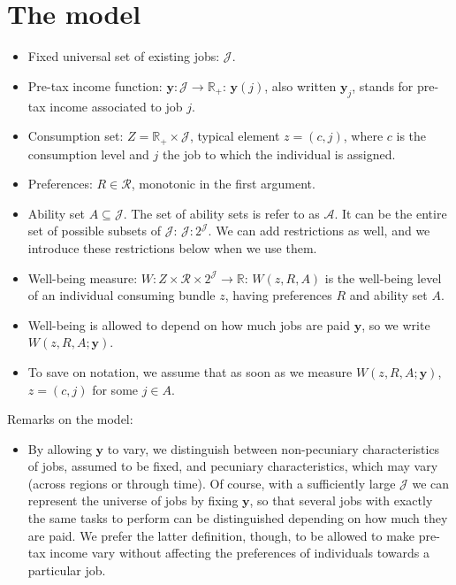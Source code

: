 \section{The model}

\begin{itemize}
    \item Fixed universal set of existing jobs: $\mathcal{J}$.
    \item Pre-tax income function: $\mathbf{y}:\mathcal{J}\rightarrow \mathbb{R}_{+}$: $\mathbf{y}(j)$, also written $\mathbf{y}_j$, stands for pre-tax income associated to job $j$. 
    \item Consumption set: $Z=\mathbb{R}_{+}\times \mathcal{J}$, typical element $z=(c,j)$, where $c$ is the consumption level and $j$ the job to which the individual is assigned.
    \item Preferences: $R\in\mathcal{R}$, monotonic in the first argument.
    \item Ability set $A\subseteq \mathcal{J}$. The set of ability sets is refer to as $\mathcal{A}$. It can be the entire set of possible subsets of $\mathcal{J}$: $\mathcal{J}:2^{\mathcal{J}}$. We can add restrictions as well, and we introduce these restrictions below when we use them.
    \item Well-being measure: $W: Z\times \mathcal{R} \times 2^{\mathcal{J}}\rightarrow \mathbb{R}$: $W(z,R,A)$ is the well-being level of an individual consuming bundle $z$, having preferences $R$ and ability set $A$.
    \item Well-being is allowed to depend on how much jobs are paid $\mathbf{y}$, so we write $W(z,R,A;\mathbf{y})$.
    \item To save on notation, we assume that as soon as we measure $W(z,R,A;\mathbf{y})$, $z=(c,j)$ for some $j\in A$.
\end{itemize}
Remarks on the model:
\begin{itemize}
  \item By allowing $\mathbf{y}$ to vary, we distinguish between non-pecuniary characteristics of jobs, assumed to be fixed, and pecuniary characteristics, which may vary (across regions or through time). Of course, with a sufficiently large $\mathcal{J}$ we can represent the universe of jobs by fixing $\mathbf{y}$, so that several jobs with exactly the same tasks to perform can be distinguished depending on how much they are paid. We prefer the latter definition, though, to be allowed to make pre-tax income vary without affecting the preferences of individuals towards a particular job.
\end{itemize}
